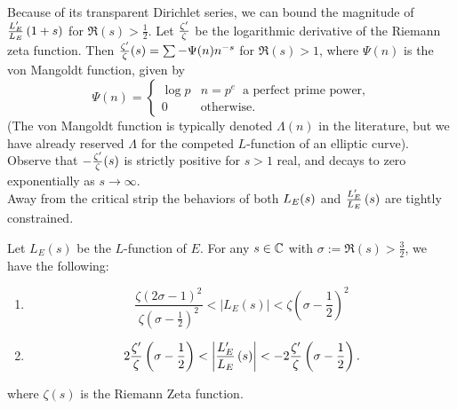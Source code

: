 Because of its transparent Dirichlet series, we can bound the magnitude of $\frac{L_E^{\prime}}{L_E}\left(1+s\right)$ for $\Re(s)>\frac{1}{2}$. Let $\frac{\zeta^{\prime}}{\zeta}$ be the logarithmic derivative of the Riemann zeta function. Then $\frac{\zeta^{\prime}}{\zeta}(s) = \sum -\Psi(n) n^{-s}$ for $\Re(s)>1$, where $\Psi(n)$ is the von Mangoldt function, given by
\begin{equation}\label{eqn:vonmangoldt}
\Psi(n) = \begin{cases} \log p & n = p^e \;\;\text{a perfect prime power,} \\ 0 & \text{otherwise.} \end{cases}
\end{equation}
(The von Mangoldt function is typically denoted $\Lambda(n)$ in the literature, but we have already reserved $\Lambda$ for the competed $L$-function of an elliptic curve). Observe that $-\frac{\zeta^{\prime}}{\zeta}(s)$ is strictly positive for $s > 1$ real, and decays to zero exponentially as $s \to \infty$. \\

Away from the critical strip the behaviors of both $L_E(s)$ and $\frac{L_E^{\prime}}{L_E}\left(s\right)$ are tightly constrained.
\begin{lemma}\label{lem:ldLe_bound}
Let $L_E(s)$ be the $L$-function of $E$. For any $s \in \mathbb{C}$ with $\sigma := \Re(s) >\frac{3}{2}$, we have the following:
\begin{enumerate}
\item
\begin{equation}\label{ineq:bounds_on_Les}
\frac{\zeta(2\sigma-1)^2}{\zeta(\sigma-\frac{1}{2})^2} < \left|L_E(s)\right| < \zeta\left(\sigma-\frac{1}{2}\right)^2
\end{equation}
\item
\begin{equation}\label{ineq:bounds_on_Ldles}
2\frac{\zeta^{\prime}}{\zeta}\left(\sigma-\frac{1}{2}\right) < \left| \frac{L_E^{\prime}}{L_E}\left(s\right)\right| < -2\frac{\zeta^{\prime}}{\zeta}\left(\sigma-\frac{1}{2}\right).
\end{equation}
\end{enumerate}
where $\zeta(s)$ is the Riemann Zeta function.
\end{lemma}

